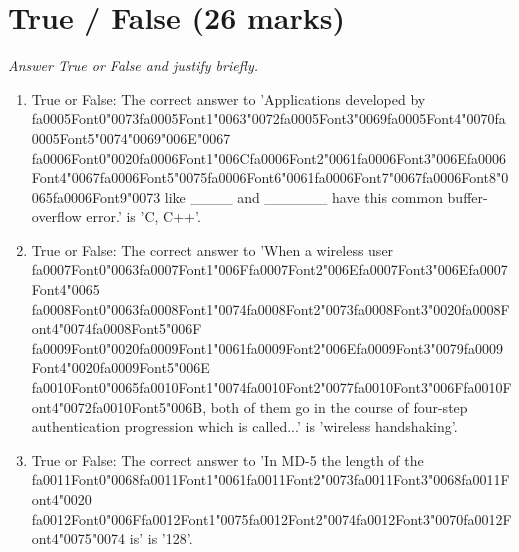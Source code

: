 \documentclass[12pt]{article}
\begin{document}
\section*{True / False (26 marks)}
\textit{Answer True or False and justify briefly.}
\begin{enumerate}[label=\arabic*.]
\item True or False: The correct answer to 'Applications developed by {\csname fa0005Font0\endcsname\char"0073}{\csname fa0005Font1\endcsname\char"0063}{\char"0072}{\csname fa0005Font3\endcsname\char"0069}{\csname fa0005Font4\endcsname\char"0070}{\csname fa0005Font5\endcsname\char"0074}{\char"0069}{\char"006E}{\char"0067} {\csname fa0006Font0\endcsname\char"0020}{\csname fa0006Font1\endcsname\char"006C}{\csname fa0006Font2\endcsname\char"0061}{\csname fa0006Font3\endcsname\char"006E}{\csname fa0006Font4\endcsname\char"0067}{\csname fa0006Font5\endcsname\char"0075}{\csname fa0006Font6\endcsname\char"0061}{\csname fa0006Font7\endcsname\char"0067}{\csname fa0006Font8\endcsname\char"0065}{\csname fa0006Font9\endcsname\char"0073} like \_\_\_\_ and \_\_\_\_\_\_ have this common buffer-overflow error.' is 'C, C++'.
\item True or False: The correct answer to 'When a wireless user {\csname fa0007Font0\endcsname\char"0063}{\csname fa0007Font1\endcsname\char"006F}{\csname fa0007Font2\endcsname\char"006E}{\csname fa0007Font3\endcsname\char"006E}{\csname fa0007Font4\endcsname\char"0065} {\csname fa0008Font0\endcsname\char"0063}{\csname fa0008Font1\endcsname\char"0074}{\csname fa0008Font2\endcsname\char"0073}{\csname fa0008Font3\endcsname\char"0020}{\csname fa0008Font4\endcsname\char"0074}{\csname fa0008Font5\endcsname\char"006F} {\csname fa0009Font0\endcsname\char"0020}{\csname fa0009Font1\endcsname\char"0061}{\csname fa0009Font2\endcsname\char"006E}{\csname fa0009Font3\endcsname\char"0079}{\csname fa0009Font4\endcsname\char"0020}{\csname fa0009Font5\endcsname\char"006E} {\csname fa0010Font0\endcsname\char"0065}{\csname fa0010Font1\endcsname\char"0074}{\csname fa0010Font2\endcsname\char"0077}{\csname fa0010Font3\endcsname\char"006F}{\csname fa0010Font4\endcsname\char"0072}{\csname fa0010Font5\endcsname\char"006B}, both of them go in the course of four-step authentication progression which is called...' is 'wireless handshaking'.
\item True or False: The correct answer to 'In MD-5 the length of the {\csname fa0011Font0\endcsname\char"0068}{\csname fa0011Font1\endcsname\char"0061}{\csname fa0011Font2\endcsname\char"0073}{\csname fa0011Font3\endcsname\char"0068}{\csname fa0011Font4\endcsname\char"0020} {\csname fa0012Font0\endcsname\char"006F}{\csname fa0012Font1\endcsname\char"0075}{\csname fa0012Font2\endcsname\char"0074}{\csname fa0012Font3\endcsname\char"0070}{\csname fa0012Font4\endcsname\char"0075}{\char"0074} is' is '128'.

\end{enumerate}
\end{document}
